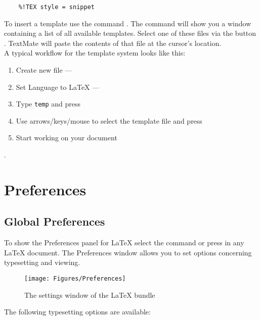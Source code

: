 \documentclass[11pt, x11names]{article}
\begin{document}
\begin{verbatim}
    %!TEX style = snippet
\end{verbatim}

To insert a template use the command . The command will show you a window containing a list of all available templates. Select one of these files via the button . TextMate will paste the contents of that file at the cursor's location.\\

A typical workflow for the template system looks like this:

\begin{enumerate}
  \item Create new file — 
  \item Set Language to LaTeX — 
  \item Type \texttt{temp} and press \keys{\tab}
  \item Use arrows/keys/mouse to select the template file and press \keys{\return}
  \item Start working on your document
\end{enumerate}

.

\section{Preferences}
\label{sec:preferences}

\subsection{Global Preferences}

To show the Preferences panel for LaTeX select the command  or press \keys{\Alt + \cmd + ,} in any LaTeX document. The Preferences window allows you to set options concerning typesetting and viewing.

\begin{figure}[h]
  \centering
    \texttt{[image: Figures/Preferences]}
  \caption{The settings window of the LaTeX bundle}
  \label{fig:Figures_Preferences}
\end{figure}

The following typesetting options are available:
\end{document}
